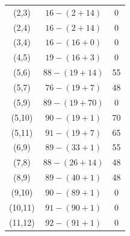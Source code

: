 \documentclass{article}
\begin{document}
\begin{center}
\begin{table}[]
\begin{center}
\begin{tabular}{|c|c|c|}
           (2,3) & $16-(2+14)$ & 0 \\

           (2,4) & $16-(2+14)$ & 0 \\

           (3,4) & $16-(16+0)$ & 0 \\

           (4,5) & $19-(16+3)$ & 0 \\

           (5,6) & $88-(19+14)$ & 55 \\
           
           (5,7) & $76-(19+7)$ & 48 \\
           
           (5,9) & $89-(19+70)$ & 0 \\
           
           (5,10) & $90-(19+1)$ & 70 \\

           
           (5,11) & $91-(19+7)$ & 65 \\

           (6,9) & $89-(33+1)$ & 55 \\
           
           (7,8) & $88 - (26 + 14)$ & 48 \\
           
           (8,9) & $89-(40+1)$ & 48 \\
           
           (9,10) & $90-(89+1)$ & 0 \\
           
           (10,11) & $91 - (90 + 1)$ & 0 \\
           
           (11,12) & $92-(91+1)$ & 0 \\


            \hline
                                                     
                        
                                        
        \end{tabular}
    \end{center}
\end{table}
\end{center}
\end{document}
